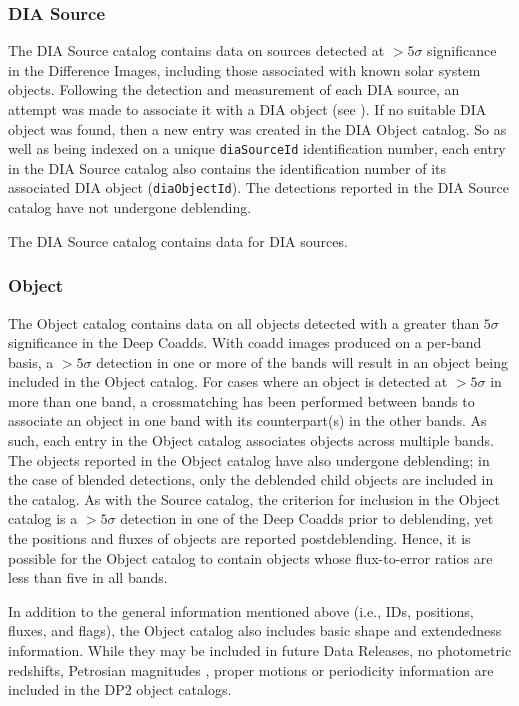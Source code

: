 \subsubsection{DIA Source}
\label{sssec:DIASource}
The \gls{DIA} Source catalog contains data on sources detected at $>5\sigma$ significance in the Difference Images, including those associated with known solar system objects.
Following the detection and measurement of each DIA source, an attempt was made to associate it with a \gls{DIA} object (see ).
If no suitable DIA object was found, then a new entry was created in the DIA Object catalog.
So as well as being indexed on a unique \texttt{diaSourceId} identification number, each entry in the DIA Source catalog also contains the identification number of its associated DIA object (\texttt{diaObjectId}).
The detections reported in the \gls{DIA} Source catalog have not undergone deblending.

The \gls{DIA} Source catalog contains data for \ndiasources \gls{DIA} sources.

\subsubsection{Object}
\label{sssec:object}
The \gls{Object} catalog contains data on all objects detected with a greater than $5\sigma$ significance in the Deep Coadds.
With coadd images produced on a per-band basis, a $>5\sigma$ detection in one or more of the bands will result in an object being included in the \gls{Object} catalog.
For cases where an object is detected at $>5\sigma$ in more than one band, a crossmatching has been performed between bands to associate an object in one band with its counterpart(s) in the other bands.
As such, each entry in the Object catalog associates objects across multiple bands.
The objects reported in the \gls{Object} catalog have also undergone deblending; in the case of blended detections, only the deblended child objects are included in the catalog.
As with the Source catalog, the criterion for inclusion in the \gls{Object} catalog is a $>5\sigma$ detection in one of the Deep Coadds prior to deblending, yet the positions and fluxes of objects are reported postdeblending.
Hence, it is possible for the Object catalog to contain objects whose \gls{flux}-to-error ratios are less than five in all bands.

In addition to the general information mentioned above (i.e., IDs, positions, fluxes, and flags), the Object catalog also includes basic \gls{shape} and extendedness information.
While they may be included in future Data Releases, no photometric redshifts, Petrosian magnitudes \citep[][]{1976ApJ...209L...1P}, proper motions or periodicity information are included in the DP2 object catalogs.

